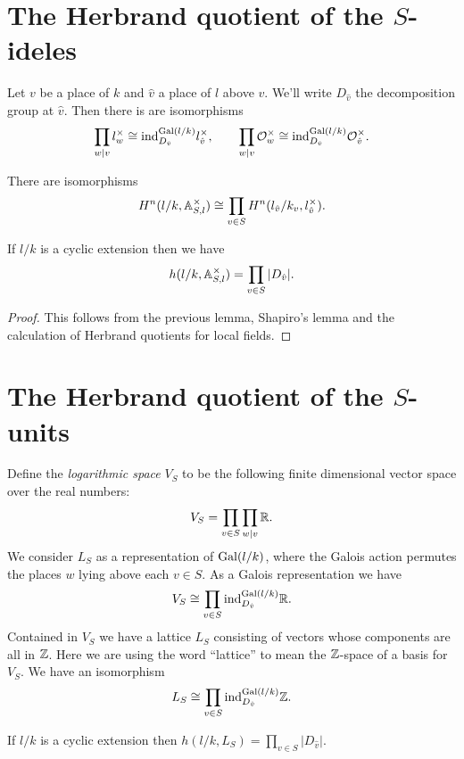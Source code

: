 \section{The Herbrand quotient of the $S$-ideles}

Let $v$ be a place of $k$ and $\hat v$ a place of $l$ above $v$.
We'll write $D_{\hat v}$ the decomposition group at $\hat v$.
Then there is are isomorphisms
\[
	\prod_{w | v} l_w^\times
	\cong
	\mathrm{ind}_{D_{\hat v}}^{\mathrm{Gal}(l/k)} l_{\hat v}^\times,
	\qquad
	\prod_{w | v} {\mathcal O}_w^\times
	\cong
	\mathrm{ind}_{D_{\hat v}}^{\mathrm{Gal}(l/k)} {\mathcal O}_{\hat v}^\times.
\]

\begin{lemma}
	There are isomorphisms
	\[
		H^n(l/k, {\mathbb A}_{S,l} ^\times)
		\cong
		\prod_{v \in S} H^n(l_{\hat v} / k_v, l_{\hat v}^\times).
	\]
\end{lemma}

\begin{lemma}
	If $l/k$ is a cyclic extension then we have
	\[
		h(l/k, {\mathbb A}_{S,l} ^\times )
		=
		\prod_{v \in S} |D_{\hat v}|.
	\]
\end{lemma}

\begin{proof}
	This follows from the previous lemma, Shapiro's lemma and the
	calculation of Herbrand quotients for local fields.
\end{proof}


\section{The Herbrand quotient of the $S$-units}

Define the \emph{logarithmic space} $V_S$ to be the following finite dimensional vector space
over the real numbers:
\[
	V_S = \prod_{v \in S} \prod_{w | v} {\mathbb R}.
\]
We consider $L_S$ as a representation of $\mathrm{Gal}(l/k)$, where the Galois action
permutes the places $w$ lying above each $v \in S$.
As a Galois representation we have
\[
	V_S \cong \prod_{v \in S} \mathrm{ind}_{D_{\hat v}}^{\mathrm{Gal}(l/k)} {\mathbb R}.
\]
Contained in $V_S$ we have a lattice $L_S$ consisting of vectors whose components are all in ${\mathbb Z}$.
Here we are using the word ``lattice'' to mean the ${\mathbb Z}$-space of a basis for $V_S$.
We have an isomorphism
\[
	L_S \cong \prod_{v \in S} \mathrm{ind}_{D_{\hat v}}^{\mathrm{Gal}(l/k)} {\mathbb Z}.
\]

\begin{lemma}
	If $l/k$ is a cyclic extension then
	$h(l/k,L_S) = \prod_{v \in S} |D_{\hat v}|$.
\end{lemma}

